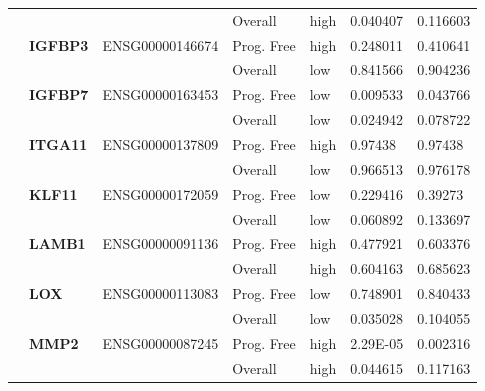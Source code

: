 \begin{spacing}{1}
{\begin{longtable}{|>{\bfseries}p{2cm}|>{\bfseries}p{1.9cm}|p{2.8cm}|p{2cm}|p{2cm}|p{1.5cm}|p{1.5cm}|}
            \hhline{~~~----}
             &          &                 & Overall    & high & 0.040407 & 0.116603                \\
            \hhline{~======}
             & IGFBP3   & ENSG00000146674 & Prog. Free & high & 0.248011 & 0.410641                \\
            \hhline{~~~----}
             &          &                 & Overall    & low  & 0.841566 & 0.904236                \\
            \hhline{~======}
             & IGFBP7   & ENSG00000163453 & Prog. Free & low  & 0.009533 & 0.043766                \\
            \hhline{~~~----}
             &          &                 & Overall    & low  & 0.024942 & 0.078722                \\
            \hhline{~======}
             & ITGA11   & ENSG00000137809 & Prog. Free & high & 0.97438  & 0.97438                 \\
            \hhline{~~~----}
             &          &                 & Overall    & low  & 0.966513 & 0.976178                \\
            \hhline{~======}
             & KLF11    & ENSG00000172059 & Prog. Free & low  & 0.229416 & 0.39273                 \\
            \hhline{~~~----}
             &          &                 & Overall    & low  & 0.060892 & 0.133697                \\
            \hhline{~======}
             & LAMB1    & ENSG00000091136 & Prog. Free & high & 0.477921 & 0.603376                \\
            \hhline{~~~----}
             &          &                 & Overall    & high & 0.604163 & 0.685623                \\
            \hhline{~======}
             & LOX      & ENSG00000113083 & Prog. Free & low  & 0.748901 & 0.840433                \\
            \hhline{~~~----}
             &          &                 & Overall    & low  & 0.035028 & 0.104055                \\
            \hhline{~======}
             & MMP2     & ENSG00000087245 & Prog. Free & high & 2.29E-05 & 0.002316                \\
            \hhline{~~~----}
             &          &                 & Overall    & high & 0.044615 & 0.117163                \\

\end{longtable}}
\end{spacing}
